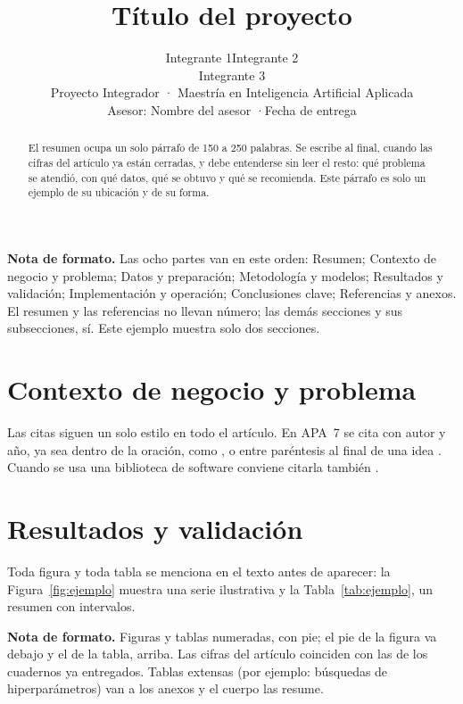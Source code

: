 \documentclass[letterpaper,11pt]{article}
\title{\textbf{Título del proyecto}}
\author{Integrante 1\quad Integrante 2\\[2pt] Integrante 3\\[6pt]
  \normalsize Proyecto Integrador · Maestría en Inteligencia Artificial Aplicada \\[6pt]
  \normalsize Asesor: Nombre del asesor \quad·\quad Fecha de entrega}
\date{\vspace{-2ex}}
\begin{document}
\maketitle

\begin{abstract}
El resumen ocupa un solo párrafo de 150 a 250 palabras. Se escribe al final, cuando las cifras del artículo ya están cerradas, y debe entenderse sin leer el resto: qué problema se atendió, con qué datos, qué se obtuvo y qué se recomienda. Este párrafo es solo un ejemplo de su ubicación y de su forma.
\end{abstract}

\begin{nota}
\textbf{Nota de formato.} Las ocho partes van en este orden: Resumen; Contexto de negocio y problema; Datos y preparación; Metodología y modelos; Resultados y validación; Implementación y operación; Conclusiones clave; Referencias y anexos. El resumen y las referencias no llevan número; las demás secciones y sus subsecciones, sí. Este ejemplo muestra solo dos secciones.
\end{nota}

\section{Contexto de negocio y problema}
Las citas siguen un solo estilo en todo el artículo. En APA~7 se cita con autor y año, ya sea dentro de la oración, como \textcite{breiman2001}, o entre paréntesis al final de una idea \parencite{hastie2009}. Cuando se usa una biblioteca de software conviene citarla también \parencite{pedregosa2011}.

\setcounter{section}{3}
\section{Resultados y validación}
Toda figura y toda tabla se menciona en el texto antes de aparecer: la
Figura~\ref{fig:ejemplo} muestra una serie ilustrativa y la Tabla~\ref{tab:ejemplo}, un resumen con intervalos.

\begin{nota}
\textbf{Nota de formato.} Figuras y tablas numeradas, con pie; el pie de la figura va debajo y el de la tabla, arriba. Las cifras del artículo coinciden con las de los cuadernos ya entregados. Tablas extensas (por ejemplo: búsquedas de hiperparámetros) van a los anexos y el cuerpo las resume.
\end{nota}
\end{document}
